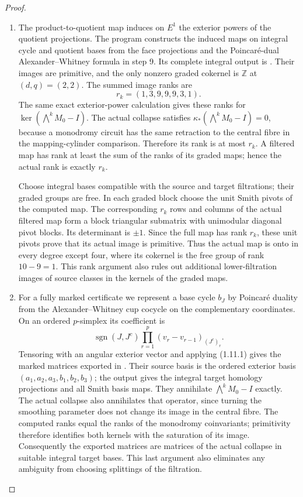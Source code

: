 \begin{proof}
\begin{enumerate}[label=\arabic*.]
\item The product-to-quotient map induces on $E^1$ the exterior powers of
the quotient projections.  The program  constructs the induced maps
on integral cycle and quotient bases from the face projections and the
Poincar\'e-dual Alexander--Whitney formula in step 9. Its complete
integral output is .
Their images are primitive, and the only nonzero graded cokernel
is $\mathbb Z$ at $(d,q)=(2,2)$.  The summed image ranks are
\[
             r_k=(1,3,9,9,9,3,1).
\]
The same exact exterior-power calculation gives these ranks for
$\ker(\bigwedge^kM_0-I)$.
The actual collapse satisfies
$\kappa_*(\bigwedge^kM_0-I)=0$, because a monodromy circuit
has the same retraction to the central fibre in the mapping-cylinder
comparison.  Therefore its rank is at most $r_k$.
A filtered map has rank at least the sum of the ranks of its
graded maps; hence the actual rank is exactly $r_k$.

Choose integral bases compatible with the source and target
filtrations; their graded groups are free.  In each graded block
choose the unit Smith pivots of the computed map.  The corresponding
$r_k$ rows and columns of the actual filtered map form a block
triangular submatrix with unimodular diagonal pivot blocks.
Its determinant is $\pm1$.  Since the full map has rank $r_k$,
these unit pivots prove that its actual image is primitive.
Thus the actual map is onto in every degree except four, where its
cokernel is the free group of rank $10-9=1$.
This rank argument also rules out additional lower-filtration images
of source classes in the kernels of the graded maps.

\item For a fully marked certificate we represent a base cycle $b_J$ by
Poincar\'e duality from the Alexander--Whitney cup cocycle on the
complementary coordinates.  On an ordered $p$-simplex its coefficient
is
\[
\operatorname{sgn}(J,J^c)
 \prod_{r=1}^p(v_r-v_{r-1})_{(J^c)_r}.
\]
Tensoring with an angular exterior vector and applying (1.11.1)
gives the marked matrices exported in
. Their source basis is the ordered exterior
basis $(a_1,a_2,a_3,b_1,b_2,b_3)$; the output gives the integral
target homology projections and all Smith basis maps.
They annihilate $\bigwedge^kM_0-I$ exactly.  The actual collapse also
annihilates that operator, since turning the smoothing parameter
does not change its image in the central fibre.  The computed ranks
equal the ranks of the monodromy coinvariants; primitivity therefore
identifies both kernels with the saturation of its image.
Consequently the exported matrices are matrices of the actual
collapse in suitable integral target bases.  This last argument also
eliminates any ambiguity from choosing splittings of the filtration.

\end{enumerate}
\end{proof}

